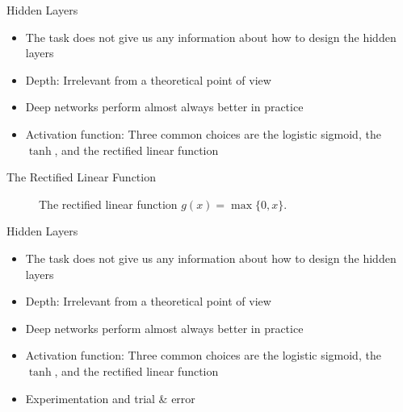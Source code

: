 \documentclass{beamer}
\begin{document}
	\begin{frame}{Hidden Layers}
		\begin{itemize}
			\item <1-> The task does not give us any information about how to design the hidden layers
			\item <2-> Depth: Irrelevant from a theoretical point of view
			\item <3-> Deep networks perform almost always better in practice
			\item <4-> Activation function: Three common choices are the logistic sigmoid, the $\tanh$, and the rectified linear function
		\end{itemize}
	\end{frame}
	\begin{frame}{The Rectified Linear Function}
		\begin{figure}
			\begin{center}
				
			\end{center}
			\caption{The rectified linear function $g(x) = \max\{0,x\}$.}
			\label{fig:sigmoid}
		\end{figure}
	\end{frame}
	\begin{frame}{Hidden Layers}
		\begin{itemize}
			\item <1-> The task does not give us any information about how to design the hidden layers
			\item <1-> Depth: Irrelevant from a theoretical point of view
			\item <1-> Deep networks perform almost always better in practice
			\item <1-> Activation function: Three common choices are the logistic sigmoid, the $\tanh$, and the rectified linear function
			\item <1-> Experimentation and trial \& error
		\end{itemize}
	\end{frame}
\end{document}
